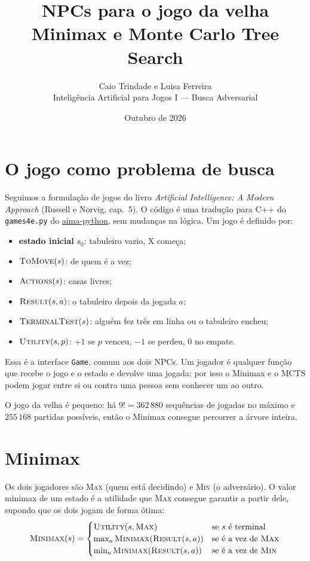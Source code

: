 \documentclass[11pt,a4paper]{article}
\title{\textbf{NPCs para o jogo da velha}\\[0.3em]
  \large Minimax e Monte Carlo Tree Search}
\author{Caio Trindade e Luisa Ferreira\\
  \small Inteligência Artificial para Jogos I --- Busca Adversarial}
\date{Outubro de 2026}
\begin{document}
\maketitle

\section{O jogo como problema de busca}

Seguimos a formulação de jogos do livro \emph{Artificial Intelligence: A Modern
Approach} (Russell e Norvig, cap.~5). O código é uma tradução para C++ do
\texttt{games4e.py} do \href{https://github.com/aimacode/aima-python}{aima-python},
sem mudanças na lógica. Um jogo é definido por:

\begin{itemize}
  \item \textbf{estado inicial} $s_0$: tabuleiro vazio, X começa;
  \item $\textsc{ToMove}(s)$: de quem é a vez;
  \item $\textsc{Actions}(s)$: casas livres;
  \item $\textsc{Result}(s, a)$: o tabuleiro depois da jogada $a$;
  \item $\textsc{TerminalTest}(s)$: alguém fez três em linha ou o tabuleiro encheu;
  \item $\textsc{Utility}(s, p)$: $+1$ se $p$ venceu, $-1$ se perdeu, $0$ no empate.
\end{itemize}

Essa é a interface \texttt{Game}, comum aos dois NPCs. Um jogador é qualquer
função que recebe o jogo e o estado e devolve uma jogada; por isso o Minimax e
o MCTS podem jogar entre si ou contra uma pessoa sem conhecer um ao outro.

O jogo da velha é pequeno: há $9! = 362\,880$ sequências de jogadas no máximo e
$255\,168$ partidas possíveis, então o Minimax consegue percorrer a árvore
inteira.

\section{Minimax}

Os dois jogadores são \textsc{Max} (quem está decidindo) e \textsc{Min} (o
adversário). O valor minimax de um estado é a utilidade que \textsc{Max}
consegue garantir a partir dele, supondo que os dois jogam de forma ótima:
\[
\textsc{Minimax}(s) =
\begin{cases}
\textsc{Utility}(s, \textsc{Max}) & \text{se } s \text{ é terminal}\\
\max_{a} \textsc{Minimax}(\textsc{Result}(s, a)) & \text{se é a vez de } \textsc{Max}\\
\min_{a} \textsc{Minimax}(\textsc{Result}(s, a)) & \text{se é a vez de } \textsc{Min}
\end{cases}
\]
\end{document}
